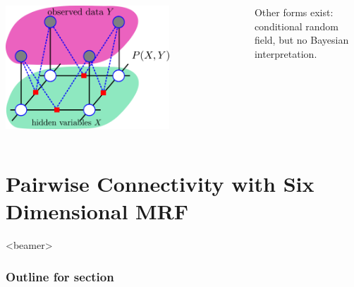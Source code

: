 \documentclass[sansserif, 10pt]{beamer}
\begin{document}
\begin{frame}
  \begin{columns}
    \begin{column}{0.5\textwidth}
      \centering
      \includegraphics[width = 0.7\textwidth]{sfig/crf}
      \end{column}
    \begin{column}{0.5\textwidth}
      \begin{block}{}

        Other forms exist: conditional random field, but no Bayesian
        interpretation.
      \end{block}
      \end{column}
    \end{columns}

\end{frame}

\section{Pairwise Connectivity with Six Dimensional MRF}

\begin{frame}<beamer>
  \frametitle{Outline for section \thesection}
  \tableofcontents[currentsection, sectionstyle=show/hide, subsectionstyle=show/show/hide]
\end{frame}
\end{document}
